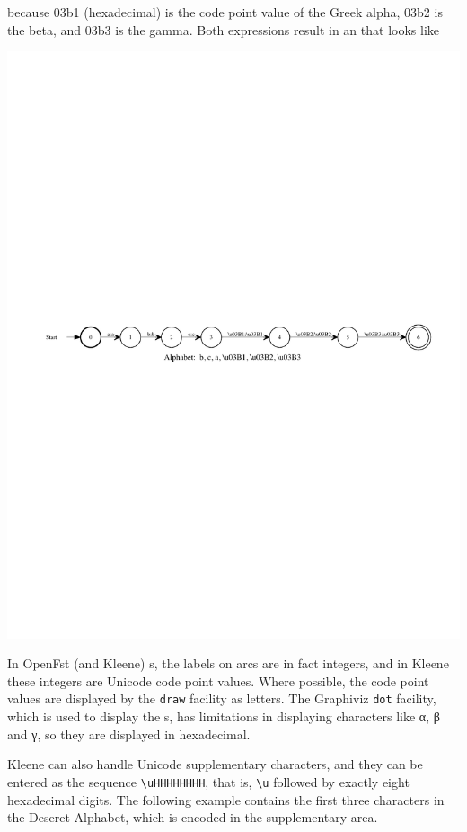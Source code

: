 \noindent
because 03b1 (hexadecimal) is the code point value of the Greek alpha, 03b2 is the beta,
and 03b3 is the gamma.  Both expressions result in an \fsm{} that looks like


\begin{center}
\includegraphics[width=135mm]{images/alphabetagamma.pdf}
\end{center}

\noindent
In OpenFst (and Kleene) \fsm{}s, the labels on arcs are in fact integers,
and in Kleene these integers are Unicode code point values.  Where possible,
the code point values are displayed by the \texttt{draw} facility as
letters.  The Graphiviz \texttt{dot}
facility, which is used to display the \fsm{}s, has limitations in displaying characters
like α, β and γ, so they are displayed in hexadecimal.  

Kleene can also handle Unicode supplementary characters, and they can be entered as the
 sequence
\verb!\uHHHHHHHH!, that is, \verb!\u! followed by exactly eight hexadecimal digits.  The following
example contains the first three characters in the Deseret Alphabet, which is encoded in
the supplementary area.


